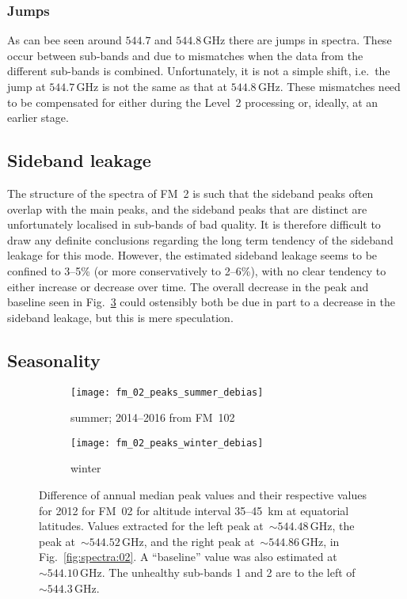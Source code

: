 \subsubsection{Jumps}
\label{FM02:jumps}
As can bee seen around $544.7$ and $544.8\,\mathrm{GHz}$ there are jumps in
spectra.  These occur between sub-bands and due to mismatches when the data
from the different sub-bands is combined.  Unfortunately, it is not a simple
shift, i.e.\ the jump at $544.7\,\mathrm{GHz}$ is not the same as that at
$544.8\,\mathrm{GHz}$.  These mismatches need to be compensated for either
during the Level~2 processing or, ideally, at an earlier stage.


\subsection{Sideband leakage}
\label{FM02:sbl}
The structure of the spectra of FM~2 is such that the sideband peaks often
overlap with the main peaks, and the sideband peaks that are distinct are
unfortunately localised in sub-bands of bad quality.  It is therefore difficult
to draw any definite conclusions regarding the long term tendency of the
sideband leakage for this mode.  However, the estimated sideband leakage seems
to be confined to 3--5\% (or more conservatively to 2--6\%), with no clear
tendency to either increase or decrease over time.  The overall decrease in the
 peak and baseline seen in Fig.~\ref{fig:peaks:02} could
ostensibly both be due in part to a decrease in the sideband leakage, but this
is mere speculation.


\subsection{Seasonality}
\label{FM02:seasonality}

\begin{figure}[ht]
    \centering
    \begin{subfigure}[b]{0.9545\textwidth}
        \texttt{[image: fm\_02\_peaks\_summer\_debias]}
        \caption{summer; 2014--2016 from FM~102}\label{fig:peaks:02:summer}
    \end{subfigure}
    \begin{subfigure}[b]{0.9545\textwidth}
        \texttt{[image: fm\_02\_peaks\_winter\_debias]}
        \caption{winter}\label{fig:peaks:02:winter}
    \end{subfigure}
    \caption{Difference of annual median peak values and their respective
        values for 2012 for FM~02 for altitude interval 35--45~km at
        equatorial latitudes. Values extracted for the left  peak
        at~$\sim544.48\,\mathrm{GHz}$, the  peak
        at~$\sim544.52\,\mathrm{GHz}$, and the right  peak
        at~$\sim544.86\,\mathrm{GHz}$, in Fig.~\ref{fig:spectra:02}.  A
        ``baseline'' value was also estimated
        at~$\sim544.10\,\mathrm{GHz}$.  The unhealthy sub-bands 1 and 2 are to
        the left of $\sim544.3\,\mathrm{GHz}$.
        }\label{fig:peaks:02}
\end{figure}

